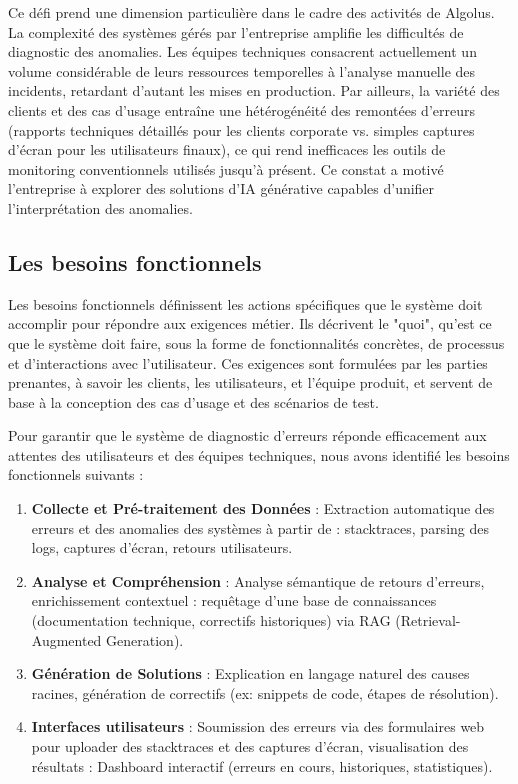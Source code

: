 \documentclass[12pt,a4paper]{report}
\begin{document}
	Ce défi prend une dimension particulière dans le cadre des activités de Algolus. La complexité des systèmes gérés par l'entreprise amplifie les difficultés de diagnostic des anomalies. Les équipes techniques consacrent actuellement un volume considérable de leurs ressources temporelles à l'analyse manuelle des incidents, retardant d'autant les mises en production. Par ailleurs, la variété des clients et des cas d'usage entraîne une hétérogénéité des remontées d'erreurs (rapports techniques détaillés pour les clients corporate vs. simples captures d'écran pour les utilisateurs finaux), ce qui rend inefficaces les outils de monitoring conventionnels utilisés jusqu'à présent. Ce constat a motivé l'entreprise à explorer des solutions d'IA générative capables d'unifier l'interprétation des anomalies.
	
	\subsection{Les besoins fonctionnels}
	
	Les besoins fonctionnels définissent les actions spécifiques que le système doit accomplir pour répondre aux exigences métier. Ils décrivent le "quoi", qu'est ce que le système doit faire, sous la forme de fonctionnalités concrètes, de processus et d'interactions avec l'utilisateur. Ces exigences sont formulées par les parties prenantes, à savoir les clients, les utilisateurs, et l'équipe produit, et servent de base à la conception des cas d’usage et des scénarios de test.
	
	Pour garantir que le système de diagnostic d’erreurs réponde efficacement aux attentes des utilisateurs et des équipes techniques, nous avons identifié les besoins fonctionnels suivants :
	
	\begin{enumerate}
		
		\item \textbf{Collecte et Pré-traitement des Données} : Extraction automatique des erreurs et des anomalies des systèmes à partir de :
		stacktraces, parsing des logs, captures d’écran, retours utilisateurs.
		
		\item \textbf{Analyse et Compréhension} : Analyse sémantique de retours d’erreurs, enrichissement contextuel : requêtage d’une base de connaissances (documentation technique, correctifs historiques) via RAG (Retrieval-Augmented Generation).
		
		\item \textbf{Génération de Solutions} : Explication en langage naturel des causes racines, génération de correctifs (ex: snippets de code, étapes de résolution).
		
		\item \textbf{Interfaces utilisateurs} : Soumission des erreurs via des formulaires web pour uploader des stacktraces et des captures d'écran, visualisation des résultats : Dashboard interactif (erreurs en cours, historiques, statistiques).
		
	\end{enumerate}
	
\end{document}
